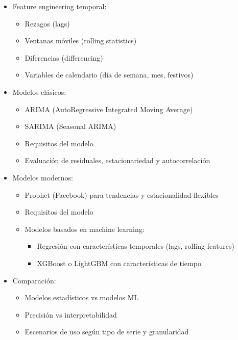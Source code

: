 \documentclass[12pt,a4paper,openany,oneside]{book}
\begin{document}
\begin{itemize}
\begin{itemize}
    \item Feature engineering temporal:
    \begin{itemize}
        \item Rezagos (lags)
        \item Ventanas móviles (rolling statistics)
        \item Diferencias (differencing)
        \item Variables de calendario (día de semana, mes, festivos)
    \end{itemize}
    
    \item Modelos clásicos:
    \begin{itemize}
        \item ARIMA (AutoRegressive Integrated Moving Average)
        \item SARIMA (Seasonal ARIMA)
        \item Requisitos del modelo
        \item Evaluación de residuales, estacionariedad y autocorrelación
    \end{itemize}
    
    \item Modelos modernos:
    \begin{itemize}
        \item Prophet (Facebook) para tendencias y estacionalidad flexibles
        \item Requisitos del modelo
        \item Modelos basados en machine learning:
        \begin{itemize}
            \item Regresión con características temporales (lags, rolling features)
            \item XGBoost o LightGBM con características de tiempo
        \end{itemize}
    \end{itemize}
    
    \item Comparación:
    \begin{itemize}
        \item Modelos estadísticos vs modelos ML
        \item Precisión vs interpretabilidad
        \item Escenarios de uso según tipo de serie y granularidad
    \end{itemize}
\end{itemize}


\end{itemize}
\end{document}
